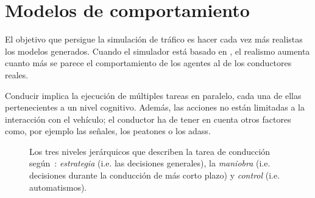 \chapter{Modelos de comportamiento}
\label{ch:sota-behavior-models}

El objetivo que persigue la simulación de tráfico es hacer cada vez más realistas los modelos generados. Cuando el simulador está basado en , el realismo aumenta cuanto más se parece el comportamiento de los agentes al de los conductores reales.

Conducir implica la ejecución de múltiples tareas en paralelo, cada una de ellas pertenecientes a un nivel cognitivo. Además, las acciones no están limitadas a la interacción con el vehículo; el conductor ha de tener en cuenta otros factores como, por ejemplo las señales, los peatones o los \glspl{adas}.

\begin{figure}
	\centering
	\caption{Los tres niveles jerárquicos que describen la tarea de conducción según~\cite{michon1985critical}: \textit{estrategia} (i.e. las decisiones generales), la \textit{maniobra} (i.e. decisiones durante la conducción de más corto plazo) y \textit{control} (i.e. automatismos).}
	\label{fig:three-levels-of-human-driving}
\end{figure}

